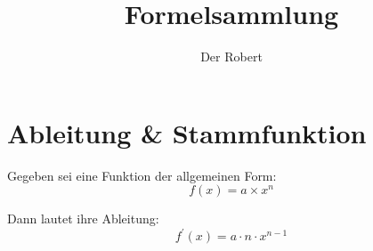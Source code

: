 \documentclass{article}
\begin{document}
\title{Formelsammlung}
\author{Der Robert}
\maketitle

\tableofcontents
\newpage


\section{Ableitung \& Stammfunktion}
Gegeben sei eine Funktion der allgemeinen Form:
\[
	f(x) = a \times x^n
\]

Dann lautet ihre Ableitung:
\[
	f^\prime (x) = a \cdot n \cdot x ^ {n - 1}
\]
\end{document}
